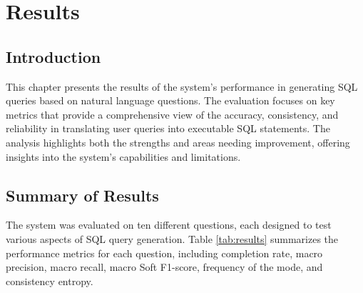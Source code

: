
%

\chapter{Results}
\label{cha:results}

\section{Introduction}

This chapter presents the results of the system's performance in generating SQL queries based on natural language questions. The evaluation focuses on key metrics that provide a comprehensive view of the accuracy, consistency, and reliability in translating user queries into executable SQL statements. The analysis highlights both the strengths and areas needing improvement, offering insights into the system's capabilities and limitations.

\section{Summary of Results}

The system was evaluated on ten different questions, each designed to test various aspects of SQL query generation. Table \ref{tab:results} summarizes the performance metrics for each question, including completion rate, macro precision, macro recall, macro Soft F1-score, frequency of the mode, and consistency entropy.

